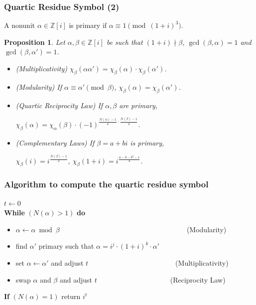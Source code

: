 \documentclass{beamer}
\newtheorem{proposition}{Proposition}
\begin{document}
\begin{frame}
\frametitle{Quartic Residue Symbol (2)}


 	\begin{definition}
 		A nonunit $\alpha \in \mathbb{Z}[i]$ is primary if $\alpha \equiv 1 \pmod{(1+i)^3}$.
 	\end{definition}
 	
 	\begin{proposition}
 	 				Let $\alpha,\beta \in \mathbb{Z}[{i}]$ be such that $(1+i) \nmid \beta$, $\gcd(\beta,\alpha) = 1$ and $\gcd(\beta,\alpha') = 1$.
 	 				\begin{itemize}
 	 					
 	 					\item (Multiplicativity) $\chi_{\beta}(\alpha \alpha') = \chi_{\beta}(\alpha) \cdot \chi_{\beta}(\alpha')$.
 	 					\item (Modularity) If $\alpha \equiv \alpha' \pmod{\beta}$, $\chi_{\beta}(\alpha) = \chi_{\beta}(\alpha')$.
 	 					\item (Quartic Reciprocity Law) If $\alpha, \beta$ are primary, 
 	 						
 	 						\hspace{30mm} $\chi_{\beta}(\alpha) = \chi_{\alpha}(\beta) \cdot (-1)^{\frac{N(\alpha)-1}{4} \cdot \frac{N(\beta)-1}{4}}$.
 	 					\item (Complementary Laws) If $\beta = a + bi$ is primary,
 	 					
 	 						\hspace{30mm} $\chi_{\beta}(i)= i^{\frac{N(\beta)-1}{2}}$,  $\chi_{\beta}(1+i) = i^{\frac{a-b-b^2-1}{4}}$.
 	 						
 	 				\end{itemize}
 	 				
 	 			\end{proposition}
 	 			
 	 			
 		
\end{frame}




\begin{frame}
\frametitle{Algorithm to compute the quartic residue symbol \cite{oswald}}

	$t \gets 0$\\
	\textbf{While} $(N(\alpha) > 1)$ \textbf{do}
	\begin{itemize}
	\item[] $\alpha \gets \alpha \bmod \beta~$~~~~~~~~~~~~~~~~~~~~~~~~~~~~~~~~~~~~(Modularity)
	\item[] find $\alpha'$ primary such that $\alpha= i^j \cdot (1+i)^k \cdot \alpha'$
	\item[] set $\alpha \gets \alpha'$ and adjust $t$~~~~~~~~~~~~~~~~~~~~~~~~~(Multiplicativity)
	\item[] swap $\alpha$ and $\beta$ and adjust $t$~~~~~~~~~~~~~~~~~~~~~(Reciprocity Law)
	\end{itemize} 
	\textbf{If} $(N(\alpha) = 1)$ return $i^t$

\end{frame}
\end{document}
